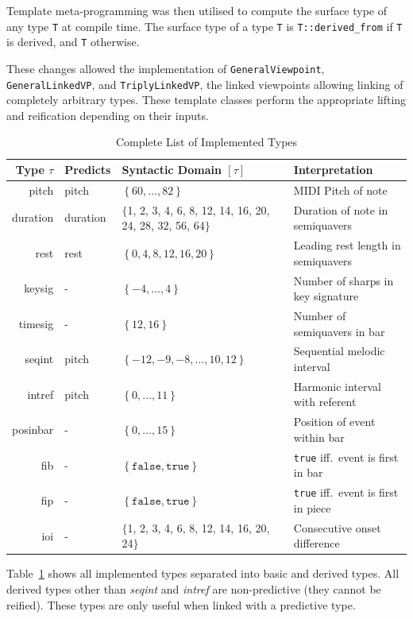 \documentclass[12pt,a4paper,twoside,openright]{report}
\newcommand{\set}[1]{ \left\{ #1 \right\} }
\begin{document}
Template meta-programming was then utilised to compute the surface type of any
type \texttt{T} at compile time. The surface type of a type \texttt{T} is
\texttt{T::derived\_from} if \texttt{T} is derived, and \texttt{T} otherwise.

These changes allowed the implementation of \texttt{GeneralViewpoint},
\texttt{GeneralLinkedVP}, and \texttt{TriplyLinkedVP}, the linked viewpoints
allowing linking of completely arbitrary types. These template classes perform
the appropriate lifting and reification depending on their inputs.

\begin{table}[H]
  \begin{tabular}{ r | l | p{4.55cm} | p{6.5cm} }
    Type $\tau$ & Predicts & Syntactic Domain $[\tau]$ & Interpretation \\ \hline
    pitch & pitch & $\set{60,\ldots,82}$ & MIDI Pitch of note \\
    duration & duration & $\{$1, 2, 3, 4, 6, 8, 12, 14, 16, 20, 24, 28, 32, 56,
    64$\}$ &
    Duration of note in semiquavers \\
    rest & rest & $\set{0,4,8,12,16,20}$ & Leading rest length in semiquavers \\
    keysig & - & $\set{-4,\ldots,4}$ & Number of sharps in key signature \\
    timesig & - & $\set{12,16}$ & Number of semiquavers in bar \\ \hline
    seqint & pitch & $\set{-12,-9,-8,\ldots,10,12}$ & Sequential melodic interval \\
    intref & pitch & $\set{0,\ldots,11}$ & Harmonic interval with referent \\
    posinbar & - & $\set{0,\ldots,15}$ & Position of event within bar \\
    fib & - & $\set{\texttt{false}, \texttt{true}}$ & \texttt{true} iff.\ event is first in bar \\
    fip & - & $\set{\texttt{false}, \texttt{true}}$ & \texttt{true} iff.\ event is first in piece \\
    ioi & - & $\{$1, 2, 3, 4, 6, 8, 12, 14, 16, 20, 24$\}$ & Consecutive onset
    difference
  \end{tabular}
  \caption{Complete List of Implemented Types}
  \label{tab:mvs-types}
\end{table}

Table~\ref{tab:mvs-types} shows all implemented types separated into basic and
derived types. All derived types other than \emph{seqint} and \emph{intref} are
non-predictive (they cannot be reified). These types are only useful when linked
with a predictive type.
\end{document}
